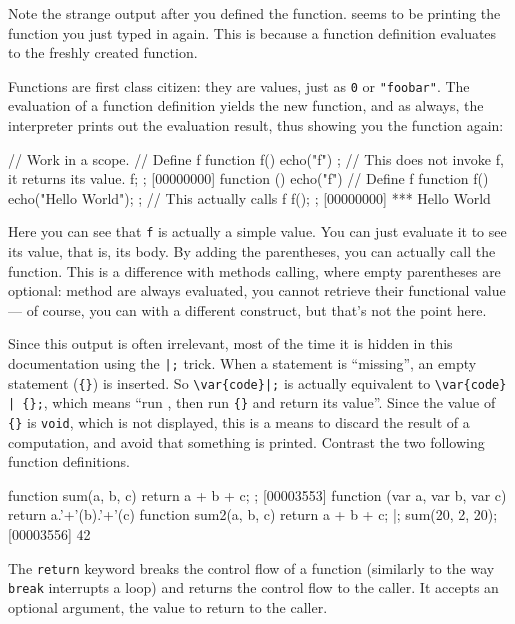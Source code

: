 Note the strange output after you defined the function. \us seems to
be printing the function you just typed in again. This is because
a function definition evaluates to the freshly created function.

Functions are first class citizen: they are values, just as
\lstinline{0} or \lstinline{"foobar"}.  The evaluation of a function
definition yields the new function, and as always, the interpreter
prints out the evaluation result, thus showing you the function
again:

\begin{urbiscript}
// Work in a scope.
{
  // Define f
  function f()
  {
    echo("f")
  };
  // This does not invoke f, it returns its value.
  f;
};
[00000000] function () { echo("f") }
{
  // Define f
  function f()
  {
    echo("Hello World");
  };
  // This actually calls f
  f();
};
[00000000] *** Hello World
\end{urbiscript}

Here you can see that \lstinline{f} is actually a simple value. You can just
evaluate it to see its value, that is, its body. By adding the
parentheses, you can actually call the function. This is a difference
with methods calling, where empty parentheses are optional: method are
always evaluated, you cannot retrieve their functional value --- of
course, you can with a different construct, but that's not the point
here.

Since this output is often irrelevant, most of the time it is hidden in this
documentation using the \lstinline'|;' trick.  When a statement is
``missing'', an empty statement (\lstinline|{}|) is inserted.  So
\lstinline'\var{code}|;' is actually equivalent to
\lstinline'\var{code} | {};', which means ``run , then run
\lstinline'{}' and return its value''.  Since the value of \lstinline'{}' is
\lstinline'void', which is not displayed, this is a means to discard the
result of a computation, and avoid that something is printed.  Contrast the
two following function definitions.

\begin{urbiscript}
function sum(a, b, c)
{
  return a + b + c;
};
[00003553] function (var a, var b, var c) { return a.'+'(b).'+'(c) }
function sum2(a, b, c)
{
  return a + b + c;
}|;
sum(20, 2, 20);
[00003556] 42
\end{urbiscript}

The \lstinline{return} keyword breaks the control flow of a function
(similarly to the way \lstinline{break} interrupts a loop) and returns the
control flow to the caller.  It accepts an optional argument, the value to
return to the caller.

